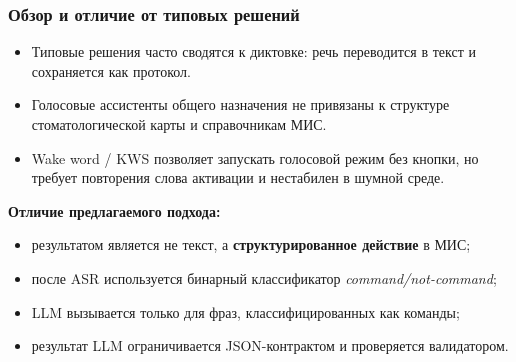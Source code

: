 \documentclass{beamer}
\begin{document}
\begin{frame}
  \frametitle{Обзор и отличие от типовых решений}

  \begin{itemize}
    \item Типовые решения часто сводятся к диктовке: речь переводится в текст и сохраняется как протокол.
    \item Голосовые ассистенты общего назначения не привязаны к структуре стоматологической карты и справочникам МИС.
    \item Wake word / KWS позволяет запускать голосовой режим без кнопки, но требует повторения слова активации и нестабилен в шумной среде.
  \end{itemize}

  \vspace{6pt}
  \textbf{Отличие предлагаемого подхода:}
  \begin{itemize}
    \item результатом является не текст, а \textbf{структурированное действие} в МИС;
    \item после ASR используется бинарный классификатор \textit{command/not-command};
    \item LLM вызывается только для фраз, классифицированных как команды;
    \item результат LLM ограничивается JSON-контрактом и проверяется валидатором.
  \end{itemize}

\end{frame}
\end{document}
